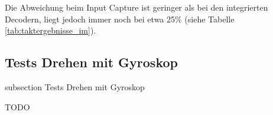 Die Abweichung beim Input Capture ist geringer als bei den integrierten Decodern, liegt jedoch immer noch bei etwa 25\% (siehe Tabelle \ref{tab:taktergebnisse_im}).


\newpage
\subsection*{Tests Drehen mit Gyroskop}\label{drehen-gyro}
    {subsection}
    {Tests Drehen mit Gyroskop}

TODO
